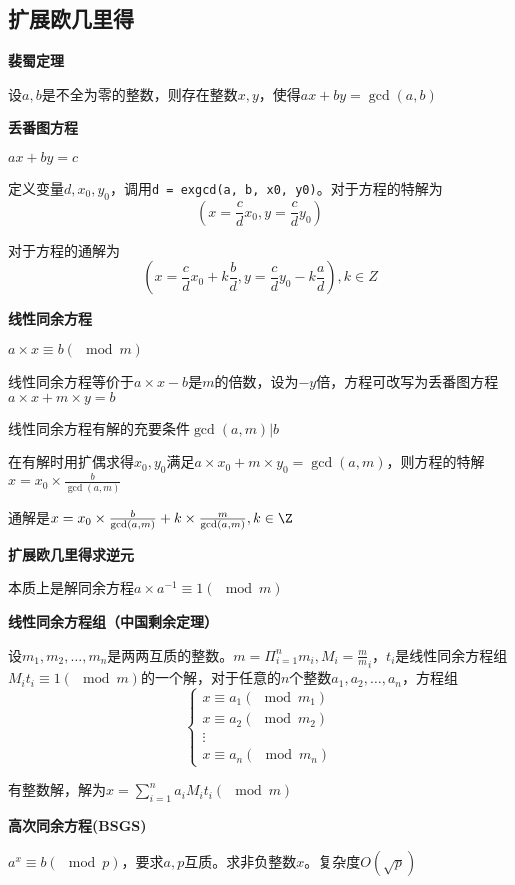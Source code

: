 \subsection{扩展欧几里得}
\textbf{裴蜀定理}

设$a,b$是不全为零的整数，则存在整数$x,y$，使得$ax+by=\gcd(a,b)$


\textbf{丢番图方程}

$ax+by=c$

定义变量$d,x_0,y_0$，调用\verb|d = exgcd(a, b, x0, y0)|。对于方程的特解为
\[
(x=\frac c d x_0 , y = \frac c d y_0)
\]

对于方程的通解为
\[
(x = \frac c d x_0 + k \frac b d , y = \frac c d y_0 - k \frac a d ) ,k \in Z
\]

\textbf{线性同余方程}

$a\times x\equiv b(\mod m)$

线性同余方程等价于$a\times x - b$是$m$的倍数，设为$-y$倍，方程可改写为丢番图方程$a \times x + m\times y=b$

线性同余方程有解的充要条件$\gcd(a,m)|b$

在有解时用扩偶求得$x_0,y_0$满足$a\times x_0+m\times y_0=\gcd(a,m)$，则方程的特解$x=x_0\times \frac b{\gcd(a,m)}$

通解是$x=x_0\times \frac b{\gcd(a,m)} + k\times \frac{m}{\gcd(a,m)},k\in \Z$



\textbf{扩展欧几里得求逆元}

本质上是解同余方程$a\times a^{-1} \equiv 1 (\mod m)$



\textbf{线性同余方程组（中国剩余定理）}

设$m_1,m_2,\dots,m_n$是两两互质的整数。$m=\Pi_{i=1}^nm_i,M_i=\frac m m_i$，$t_i$是线性同余方程组$M_it_i\equiv 1(\mod m)$的一个解，对于任意的$n$个整数$a_1,a_2,\dots,a_n$，方程组
\[
\left\{\begin{matrix}
           x\equiv a_1(\mod m_1)\\
           x\equiv a_2(\mod m_2)\\
           \vdots \\
           x\equiv a_n(\mod m_n)
\end{matrix}\right.
\]


有整数解，解为$x=\sum_{i=1}^na_iM_it_i(\mod m)$



\textbf{高次同余方程(BSGS)}

$a^x\equiv b (\mod p)$，要求$a,p$互质。求非负整数$x$。复杂度$O(\sqrt p)$
